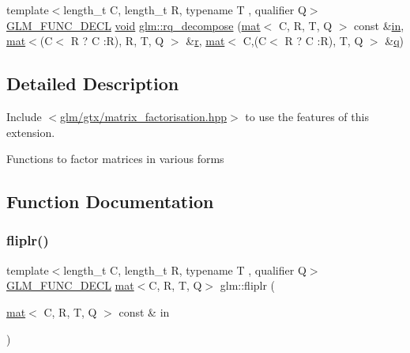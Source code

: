\begin{DoxyCompactItemize}
\item 
{\footnotesize template$<$length\+\_\+t C, length\+\_\+t R, typename T , qualifier Q$>$ }\\\mbox{\hyperlink{setup_8hpp_ab2d052de21a70539923e9bcbf6e83a51}{G\+L\+M\+\_\+\+F\+U\+N\+C\+\_\+\+D\+E\+CL}} \mbox{\hyperlink{_s_d_l__opengles2__gl2ext_8h_ae5d8fa23ad07c48bb609509eae494c95}{void}} \mbox{\hyperlink{group__gtx__matrix__factorisation_ga4e022709c9e7eaad9d7cc315d2cdb05c}{glm\+::rq\+\_\+decompose}} (\mbox{\hyperlink{structglm_1_1mat}{mat}}$<$ C, R, T, Q $>$ const \&\mbox{\hyperlink{_s_d_l__opengl__glext_8h_a83ad0ee7f1e06b59c90271716e689080}{in}}, \mbox{\hyperlink{structglm_1_1mat}{mat}}$<$(C$<$ R ? C \+:R), R, T, Q $>$ \&\mbox{\hyperlink{_s_d_l__opengl_8h_a42ce7cdc612e53abee15043f80220d97}{r}}, \mbox{\hyperlink{structglm_1_1mat}{mat}}$<$ C,(C$<$ R ? C \+:R), T, Q $>$ \&\mbox{\hyperlink{_s_d_l__opengl_8h_a8fc1e7b9baaae687804c7eed46ca09c6}{q}})
\end{DoxyCompactItemize}


\subsection{Detailed Description}
Include $<$\mbox{\hyperlink{matrix__factorisation_8hpp}{glm/gtx/matrix\+\_\+factorisation.\+hpp}}$>$ to use the features of this extension.

Functions to factor matrices in various forms 

\subsection{Function Documentation}
\mbox{\label{group__gtx__matrix__factorisation_gaf39f4e5f78eb29c1a90277d45b9b3feb}} 
\subsubsection{\texorpdfstring{fliplr()}{fliplr()}}
{\footnotesize\ttfamily template$<$length\+\_\+t C, length\+\_\+t R, typename T , qualifier Q$>$ \\
\mbox{\hyperlink{setup_8hpp_ab2d052de21a70539923e9bcbf6e83a51}{G\+L\+M\+\_\+\+F\+U\+N\+C\+\_\+\+D\+E\+CL}} \mbox{\hyperlink{structglm_1_1mat}{mat}}$<$C, R, T, Q$>$ glm\+::fliplr (\begin{DoxyParamCaption}\item[{\mbox{\hyperlink{structglm_1_1mat}{mat}}$<$ C, R, T, Q $>$ const \&}]{in }\end{DoxyParamCaption})}

